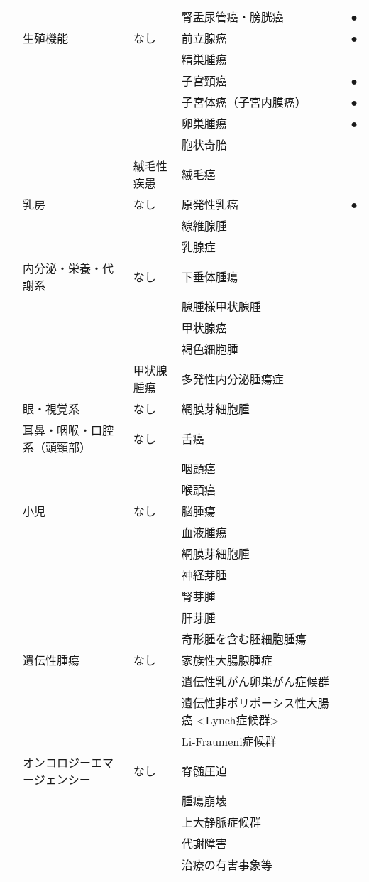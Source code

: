 \begin{xltabular}{\linewidth}{XXXXX}
 &  &  & 腎盂尿管癌・膀胱癌 & ● \\
 & 生殖機能 & なし & 前立腺癌 & ● \\
 &  &  & 精巣腫瘍 &  \\
 &  &  & 子宮頸癌 & ● \\
 &  &  & 子宮体癌（子宮内膜癌） & ● \\
 &  &  & 卵巣腫瘍 & ● \\
 &  &  & 胞状奇胎 &  \\
 &  & 絨毛性疾患 & 絨毛癌 &  \\
 & 乳房 & なし & 原発性乳癌 & ● \\
 &  &  & 線維腺腫 &  \\
 &  &  & 乳腺症 &  \\
 & 内分泌・栄養・代謝系 & なし & 下垂体腫瘍 &  \\
 &  &  & 腺腫様甲状腺腫 &  \\
 &  &  & 甲状腺癌 &  \\
 &  &  & 褐色細胞腫 &  \\
 &  & 甲状腺腫瘍 & 多発性内分泌腫瘍症 &  \\
 & 眼・視覚系 & なし & 網膜芽細胞腫 &  \\
 & 耳鼻・咽喉・口腔系（頭頸部） & なし & 舌癌 &  \\
 &  &  & 咽頭癌 &  \\
 &  &  & 喉頭癌 &  \\
 & 小児 & なし & 脳腫瘍 &  \\
 &  &  & 血液腫瘍 &  \\
 &  &  & 網膜芽細胞腫 &  \\
 &  &  & 神経芽腫 &  \\
 &  &  & 腎芽腫 &  \\
 &  &  & 肝芽腫 &  \\
 &  &  & 奇形腫を含む胚細胞腫瘍 &  \\
 & 遺伝性腫瘍 & なし & 家族性大腸腺腫症 &  \\
 &  &  & 遺伝性乳がん卵巣がん症候群 &  \\
 &  &  & 遺伝性非ポリポーシス性大腸癌 <Lynch症候群> &  \\
 &  &  & Li-Fraumeni症候群 &  \\
 & オンコロジーエマージェンシー & なし & 脊髄圧迫 &  \\
 &  &  & 腫瘍崩壊 &  \\
 &  &  & 上大静脈症候群 &  \\
 &  &  & 代謝障害 &  \\
 &  &  & 治療の有害事象等 &  \\

\end{xltabular}

